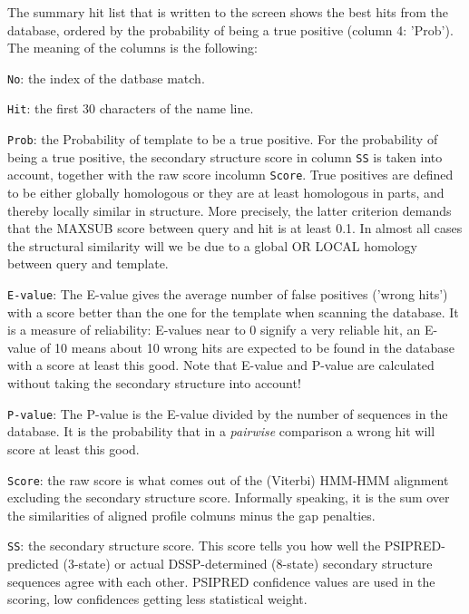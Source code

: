 \documentclass[11pt,a4paper]{article}
\begin{document}
The summary hit list that is written to the screen shows the best hits from the 
database, ordered by the probability of being a true positive (column 4: 'Prob'). 
The meaning of the columns is the following:
\vspace{5mm}

\renewcommand{\arraystretch}{1.2}

\begin{description}
\item{\verb`No`}: the index of the datbase match.

\item{\verb`Hit`}: the first 30 characters of the name line.

\item{\verb`Prob`}: the Probability of template to be a true positive.
For the probability of being a true positive, the secondary structure score 
in column \verb`SS` is taken into account, together with the raw score incolumn \verb`Score`. 
True positives are defined to be either globally homologous or they are at least 
homologous in parts, and thereby locally similar in structure. More precisely, 
the latter criterion demands that the MAXSUB score between query and hit is at 
least 0.1. In almost all cases the structural similarity will we be due to a global
OR LOCAL homology between query and template.

\item{\verb`E-value`}:
The E-value gives the average number of false positives ('wrong hits') with a score 
better than the one for the template when scanning the database. It is a measure of 
reliability: E-values near to 0 signify a very reliable hit, an E-value of 10 means 
about 10 wrong hits are expected to be found in the database with a score at least 
this good. Note that E-value and P-value are calculated without taking the secondary 
structure into account!


\item{\verb`P-value`}: 
The P-value is the E-value divided by the number of sequences in the database.
It is the probability that in a \emph{pairwise} comparison a wrong hit will score at least 
this good.

\item{\verb`Score`}: the raw score is what comes out of the (Viterbi) HMM-HMM alignment excluding
the secondary structure score. Informally speaking, it is the sum over the similarities 
of aligned profile colmuns minus the gap penalties. 

\item{\verb`SS`}: the secondary structure score.
This score tells you how well the PSIPRED-predicted (3-state) or actual DSSP-determined 
(8-state) secondary structure sequences agree with each other. PSIPRED confidence 
values are used in the scoring, low confidences getting less statistical weight.


\end{description}
\end{document}

